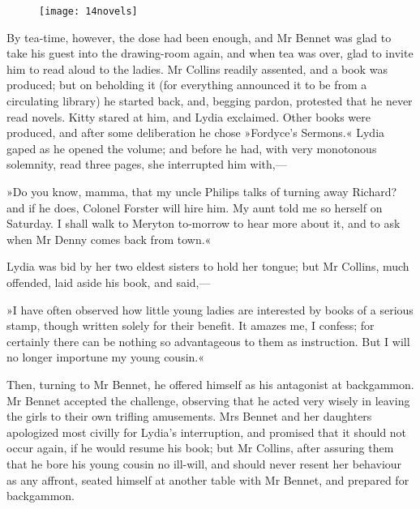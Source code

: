 \begin{figure}[tbh]
\centering
\texttt{[image: 14novels]}
\end{figure}

By tea-time, however, the dose had been enough, and Mr Bennet was glad to take his guest into the drawing-room again, and when tea was over, glad to invite him to read aloud to the ladies. Mr Collins readily assented, and a book was produced; but on beholding it (for everything announced it to be from a circulating library) he started back, and, begging pardon, protested that he never read novels. Kitty stared at him, and Lydia exclaimed. Other books were produced, and after some deliberation he chose »Fordyce's Sermons.« Lydia gaped as he opened the volume; and before he had, with very monotonous solemnity, read three pages, she interrupted him with,—

»Do you know, mamma, that my uncle Philips talks of turning away Richard? and if he does, Colonel Forster will hire him. My aunt told me so herself on Saturday. I shall walk to Meryton to-morrow to hear more about it, and to ask when Mr Denny comes back from town.«

Lydia was bid by her two eldest sisters to hold her tongue; but Mr Collins, much offended, laid aside his book, and said,—

»I have often observed how little young ladies are interested by books of a serious stamp, though written solely for their benefit. It amazes me, I confess; for certainly there can be nothing so advantageous to them as instruction. But I will no longer importune my young cousin.«

Then, turning to Mr Bennet, he offered himself as his antagonist at backgammon. Mr Bennet accepted the challenge, observing that he acted very wisely in leaving the girls to their own trifling amusements. Mrs Bennet and her daughters apologized most civilly for Lydia's interruption, and promised that it should not occur again, if he would resume his book; but Mr Collins, after assuring them that he bore his young cousin no ill-will, and should never resent her behaviour as any affront, seated himself at another table with Mr Bennet, and prepared for backgammon.